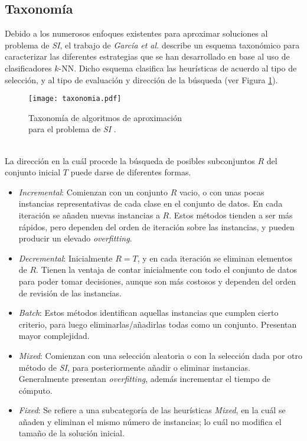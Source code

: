 \subsection{Taxonomía}

Debido a los numerosos enfoques existentes para aproximar soluciones al problema de \emph{SI}, el trabajo de \emph{García} \emph{et al.} \cite{Garcia:2012:PSN:2122272.2122582} describe un esquema taxonómico para caracterizar las diferentes estrategias que se han desarrollado en base al uso de clasificadores $k$-NN. Dicho esquema clasifica las heurísticas de acuerdo al tipo de selección, y al tipo de evaluación y dirección de la búsqueda (ver Figura \ref{graphtaxonomia}).

\begin{figure}[h!]
\centering
\texttt{[image: taxonomia.pdf]}
\caption[Taxonomía de algoritmos de SI]{Taxonomía de algoritmos de aproximación\\para el problema de \emph{SI} \cite{Garcia:2012:PSN:2122272.2122582}.}
\label{graphtaxonomia}
\end{figure}

\\
La dirección en la cuál procede la búsqueda de posibles subconjuntos $R$ del conjunto inicial $T$ puede darse de diferentes formas.
\begin{itemize}
\item \emph{Incremental}:
Comienzan con un conjunto $R$ vacio, o con unas pocas instancias representativas de cada clase en el conjunto de datos. En cada iteración se añaden nuevas instancias a $R$. Estos métodos tienden a ser más rápidos, pero dependen del orden de iteración sobre las instancias, y pueden producir un elevado \emph{overfitting}.
\item \emph{Decremental}:
Inicialmente $R = T$, y en cada iteración se eliminan elementos de $R$. Tienen la ventaja de contar inicialmente con todo el conjunto de datos para poder tomar decisiones, aunque son más costosos y dependen del orden de revisión de las instancias.
\item \emph{Batch}:
Estos métodos identifican aquellas instancias que cumplen cierto criterio, para luego eliminarlas/añadirlas todas como un conjunto. Presentan mayor complejidad.
\item \emph{Mixed}:
Comienzan con una selección aleatoria o con la selección dada por otro método de \emph{SI}, para posteriormente añadir o eliminar instancias. Generalmente presentan \emph{overfitting}, además incrementar el tiempo de cómputo.
\item \emph{Fixed}:
Se refiere a una subcategoría de las heurísticas \emph{Mixed}, en la cuál se añaden y eliminan el mismo número de instancias; lo cuál no modifica el tamaño de la solución inicial.
\end{itemize}


